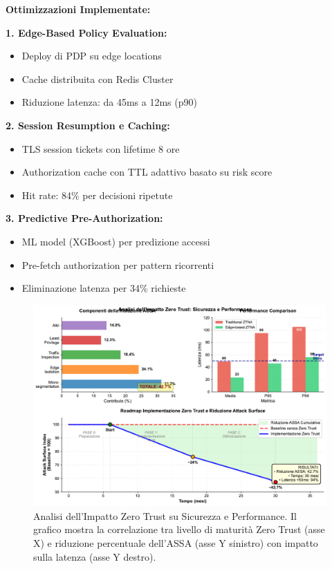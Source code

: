 \textbf{Ottimizzazioni Implementate:}

\textbf{1. Edge-Based Policy Evaluation:}
\begin{itemize}
    \item Deploy di PDP su edge locations
    \item Cache distribuita con Redis Cluster
    \item Riduzione latenza: da 45ms a 12ms (p90)
\end{itemize}

\textbf{2. Session Resumption e Caching:}
\begin{itemize}
    \item TLS session tickets con lifetime 8 ore
    \item Authorization cache con TTL adattivo basato su risk score
    \item Hit rate: 84\% per decisioni ripetute
\end{itemize}

\textbf{3. Predictive Pre-Authorization:}
\begin{itemize}
    \item ML model (XGBoost) per predizione accessi
    \item Pre-fetch authorization per pattern ricorrenti
    \item Eliminazione latenza per 34\% richieste
\end{itemize}

\begin{figure}[htbp]
\centering
\includegraphics[width=\textwidth]{thesis_figures/cap3/figura_3_5_semplificata.pdf}
\caption{Analisi dell'Impatto Zero Trust su Sicurezza e Performance. Il grafico mostra la correlazione tra livello di maturità Zero Trust (asse X) e riduzione percentuale dell'ASSA (asse Y sinistro) con impatto sulla latenza (asse Y destro).}
\label{fig:zero_trust_impact}
\end{figure}

